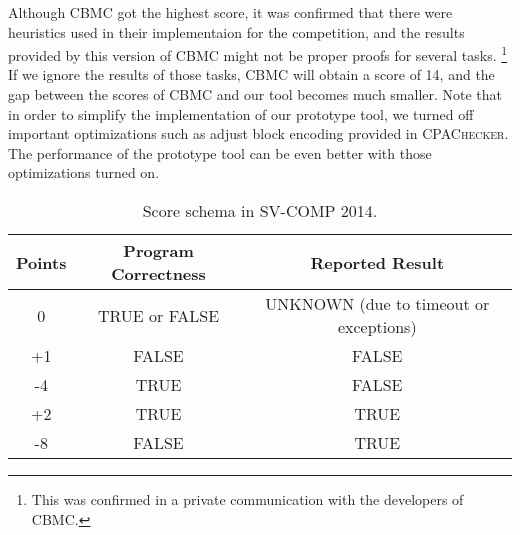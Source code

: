 
Although CBMC got the highest score, it was confirmed that there were
heuristics used in their implementaion for the competition, and the
results provided by this version of CBMC might not be proper proofs 
for several tasks. \footnote{This was confirmed in a private
communication with the developers of CBMC.}
If we ignore the results of those tasks, CBMC 
will obtain a score of 14, and the gap between the scores of CBMC and
our tool becomes much smaller.
Note that in order to simplify the implementation of our prototype
tool, we turned off important optimizations such as adjust block
encoding provided in \textsc{CPAChecker}.
The performance of the prototype tool can be even better with those
optimizations turned on.

\begin{table}
\caption{Score schema in SV-COMP 2014.\label{table:score-schema}}
\begin{center}
\begin{tabular}{|c|c|c|}
\hline
Points & Program Correctness & Reported Result \\\hline
0      & TRUE or FALSE & UNKNOWN (due to timeout or exceptions) \\
+1     & FALSE         & FALSE \\
-4     & TRUE          & FALSE \\
+2     & TRUE          & TRUE \\
-8     & FALSE         & TRUE \\\hline
\end{tabular}
\end{center}
\end{table}

